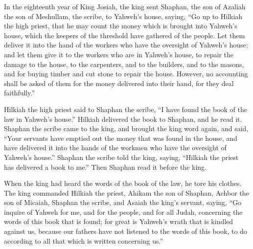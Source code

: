 \begin{paracol}{2}
\begin{otherlanguage}{english}
 In the eighteenth year of King Josiah, the king sent
Shaphan, the son of Azaliah the son of Meshullam, the scribe, to
Yahweh's house, saying,  ``Go up to Hilkiah the high
priest, that he may count the money which is brought into Yahweh's
house, which the keepers of the threshold have gathered of the people.
 Let them deliver it into the hand of the workers who have
the oversight of Yahweh's house; and let them give it to the workers who
are in Yahweh's house, to repair the damage to the house, 
to the carpenters, and to the builders, and to the masons, and for
buying timber and cut stone to repair the house.  However,
no accounting shall be asked of them for the money delivered into their
hand, for they deal faithfully.''

 Hilkiah the high priest said to Shaphan the scribe, ``I
have found the book of the law in Yahweh's house.'' Hilkiah delivered
the book to Shaphan, and he read it.  Shaphan the scribe
came to the king, and brought the king word again, and said, ``Your
servants have emptied out the money that was found in the house, and
have delivered it into the hands of the workmen who have the oversight
of Yahweh's house.''  Shaphan the scribe told the king,
saying, ``Hilkiah the priest has delivered a book to me.'' Then Shaphan
read it before the king.

 When the king had heard the words of the book of the
law, he tore his clothes.  The king commanded Hilkiah the
priest, Ahikam the son of Shaphan, Achbor the son of Micaiah, Shaphan
the scribe, and Asaiah the king's servant, saying,  ``Go
inquire of Yahweh for me, and for the people, and for all Judah,
concerning the words of this book that is found; for great is Yahweh's
wrath that is kindled against us, because our fathers have not listened
to the words of this book, to do according to all that which is written
concerning us.''


\end{otherlanguage}
\end{paracol}
